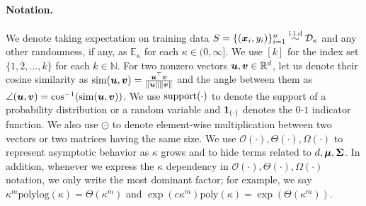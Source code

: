 \paragraph{Notation.}
We denote taking expectation on training data $S = \{({\bm{x}}_i, y_i)\}_{i=1}^n \overset{\mathrm{i.i.d}}{\sim} \mathcal{D}_\kappa$ and any other randomness, if any, 
as $\mathbb{E}_\kappa$ for each $\kappa \in (0, \infty]$. We use $[k]$ for the index set $\{1, 2, \dots, k\}$ for each $k \in \mathbb{N}$. For two nonzero vectors ${\bm{u}},{\bm{v}} \in \mathbb{R}^d$, let us denote their cosine similarity as $\mathrm{sim}({\bm{u}},{\bm{v}}) = \frac{{\bm{u}}^\top {\bm{v}}}{\lVert {\bm{u}}\rVert\lVert {\bm{v}}\rVert}$ and the angle between them as $\angle({\bm{u}},{\bm{v}}) = \cos^{-1}(\mathrm{sim}({\bm{u}},{\bm{v}}))$. We use $\mathrm{support}(\cdot)$ to denote the support of a probability distribution or a random variable and ${\bm{1}}_{(\cdot)}$ denotes the $0$-$1$ indicator function. We also use $\odot$ to denote element-wise multiplication between two vectors or two matrices having the same size. We use $\mathcal{O}(\cdot), \Theta(\cdot), \Omega(\cdot)$ to represent asymptotic behavior as $\kappa$ grows and to hide terms related to $d, {\bm{\mu}}, {\bm{\Sigma}}$. 
In addition, whenever we express the $\kappa$ dependency in $\mathcal{O}(\cdot), \Theta(\cdot), \Omega(\cdot)$ notation, we only write the most dominant factor; for example, we say $\kappa^m\mathrm{polylog}(\kappa) = \Theta(\kappa^m)$ and $\exp\left(c \kappa^m\right) \mathrm{poly}(\kappa) = \exp(\Theta(\kappa^m))$.